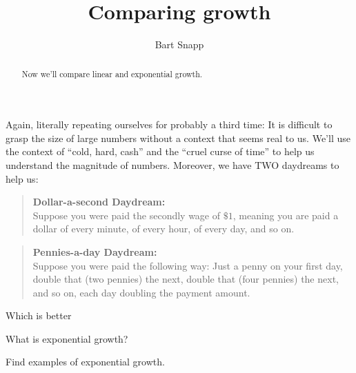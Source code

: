 \documentclass[nooutcomes,noauthor,hints]{ximera}
\title{Comparing growth}
\author{Bart Snapp}
\begin{document}
\begin{abstract}
  Now we'll compare linear and exponential growth.
\end{abstract}
\maketitle

\begin{listOutcomes}
\item 
\end{listOutcomes}


Again, literally repeating ourselves for probably a third time: It is
difficult to grasp the size of large numbers without a context that
seems real to us. We'll use the context of ``cold, hard, cash'' and
the ``cruel curse of time'' to help us understand the magnitude of
numbers. Moreover, we have TWO daydreams to help us:

\begin{mdframed}[style=OutcomeStyle]
  \begin{quote}
    \textbf{Dollar-a-second Daydream:}\\
  Suppose you were paid the secondly wage of $\$1$, meaning you are
  paid a dollar  of every minute, of every hour, of
  every day, and so on.
\end{quote}
\end{mdframed}



\begin{mdframed}[style=OutcomeStyle]
  \begin{quote}
  \textbf{Pennies-a-day Daydream:}\\
  Suppose you were paid the following way: Just a penny on your first
  day, double that (two pennies) the next, double that (four pennies)
  the next, and so on, each day doubling the payment amount.
\end{quote}
\end{mdframed}



\mynewpage


\begin{question}
 Which is better
\end{question}
\mynewpage



\begin{question}
What is exponential growth?

\end{question}
\mynewpage


\begin{question}
  Find examples of exponential growth.
\end{question}
\end{document}
